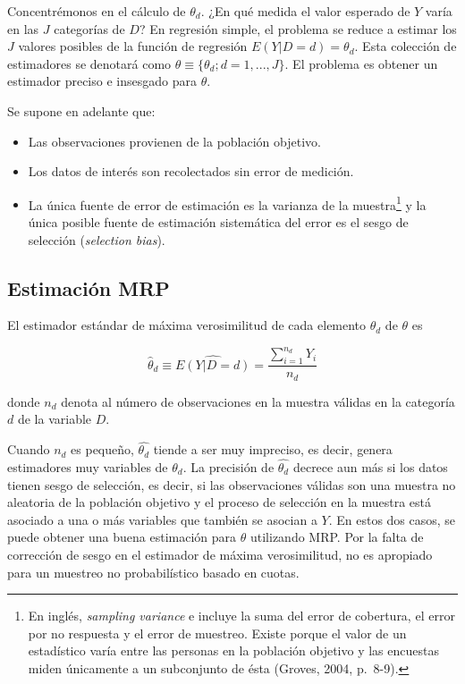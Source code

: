 \documentclass[]{article}
\let\rmarkdownfootnote\footnote%
\def\footnote{\protect\rmarkdownfootnote}
\begin{document}
Concentrémonos en el cálculo de $\theta_d$. ¿En qué medida el valor
esperado de $Y$ varía en las $J$ categorías de $D$? En regresión simple,
el problema se reduce a estimar los $J$ valores posibles de la función
de regresión $E(Y|D=d)=\theta_d$. Esta colección de estimadores se
denotará como $\theta \equiv \{ \theta_d; d=1, ..., J \}$. El problema
es obtener un estimador preciso e insesgado para $\theta$.

Se supone en adelante que:

\begin{itemize}
\itemsep1pt\parskip0pt
\item
  Las observaciones provienen de la población objetivo.
\item
  Los datos de interés son recolectados sin error de medición.
\item
  La única fuente de error de estimación es la varianza de la
  muestra\footnote{En inglés, \emph{sampling variance} e incluye la suma
    del error de cobertura, el error por no respuesta y el error de
    muestreo. Existe porque el valor de un estadístico varía entre las
    personas en la población objetivo y las encuestas miden únicamente a
    un subconjunto de ésta (Groves, 2004, p.~8-9).} y la única posible
  fuente de estimación sistemática del error es el sesgo de selección
  (\emph{selection bias}).
\end{itemize}

\subsection{Estimación MRP}\label{estimacion-mrp}

El estimador estándar de máxima verosimilitud de cada elemento
$\theta_d$ de $\theta$ es

\[
\hat{\theta}_d \equiv \hat{E(Y|D=d)} = \frac{\sum_{i=1}^{n_d} Y_i}{n_d}
\]

donde $n_d$ denota al número de observaciones en la muestra válidas en
la categoría $d$ de la variable $D$.

Cuando $n_d$ es pequeño, $\hat{\theta_d}$ tiende a ser muy impreciso, es
decir, genera estimadores muy variables de $\theta_d$. La precisión de
$\hat{\theta_d}$ decrece aun más si los datos tienen sesgo de selección,
es decir, si las observaciones válidas son una muestra no aleatoria de
la población objetivo y el proceso de selección en la muestra está
asociado a una o más variables que también se asocian a $Y$. En estos
dos casos, se puede obtener una buena estimación para $\theta$
utilizando MRP. Por la falta de corrección de sesgo en el estimador de
máxima verosimilitud, no es apropiado para un muestreo no probabilístico
basado en cuotas.
\end{document}
